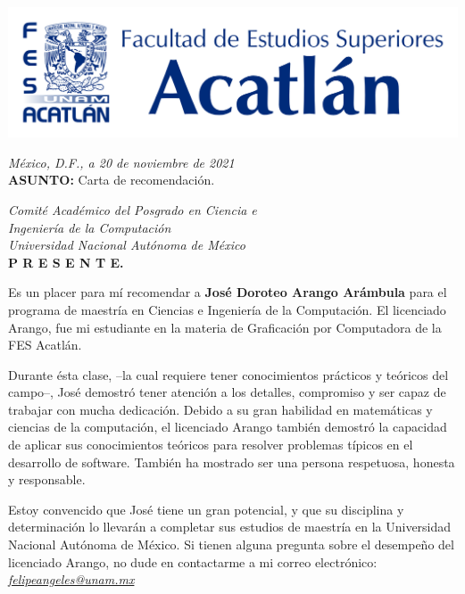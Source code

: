 \thispagestyle{empty}
\begin{large}
\begin{flushleft}
\includegraphics[scale=0.3]{img/logo-azul}
\end{flushleft}
\begin{flushright}
	\textit{México, D.F., a 20 de noviembre de 2021} \\
	\vspace{0.25cm}
	\textbf{ASUNTO:} Carta de recomendación.
\end{flushright}

\vspace{0.3cm}
\begin{flushleft}
	\textit{Comité Académico del Posgrado en Ciencia e\\Ingeniería de la Computación\\ 			Universidad Nacional Autónoma de México\\}
	\vspace{0.25cm}
	\textbf{P R E S E N T E.}
\end{flushleft}

\vspace{0.3cm}
Es un placer para mí recomendar a \textbf{José Doroteo Arango Arámbula} para el programa de maestría en Ciencias e Ingeniería de la Computación.
El licenciado Arango, fue mi estudiante en la materia de Graficación por Computadora de la FES Acatlán.

Durante ésta clase, –la cual requiere tener conocimientos prácticos y teóricos del campo–, José demostró tener atención a los detalles, compromiso y ser capaz de trabajar con mucha dedicación.
Debido a su gran habilidad en matemáticas y ciencias de la computación, el licenciado Arango también demostró la capacidad de aplicar sus conocimientos teóricos para resolver problemas típicos en el desarrollo de software.
También ha mostrado ser una persona respetuosa, honesta y responsable.

Estoy convencido que José tiene un gran potencial, y que su disciplina y determinación lo llevarán a completar sus estudios de maestría en la Universidad Nacional Autónoma de México.
Si tienen alguna pregunta sobre el desempeño del licenciado Arango, no dude en contactarme a mi correo electrónico: \href{mailto:felipeangeles@unam.mx}{\emph{felipeangeles@unam.mx}}


\end{large}
